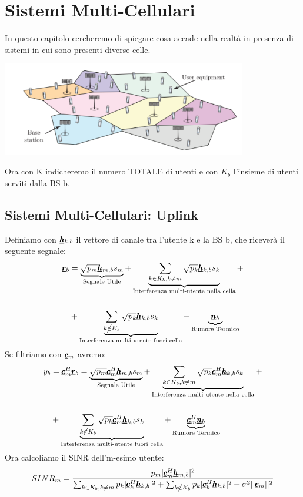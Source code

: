 \chapter{Sistemi Multi-Cellulari}
In questo capitolo cercheremo di spiegare cosa accade nella realtà in presenza di sistemi in cui sono presenti diverse celle.
\begin{center}
    \includegraphics[width=0.8\textwidth]{Images/Accass.png}
\end{center}
Ora con K indicheremo il numero TOTALE di utenti e con $K_b$ l'insieme di utenti serviti dalla BS b.
\section{Sistemi Multi-Cellulari: Uplink}
Definiamo con $\pmb{\underline{h}}_{k,b}$ il vettore di canale tra l'utente k e la BS b, che riceverà il seguente segnale:
\begin{equation*}
    \begin{aligned}
    \pmb{\underline{r}}_b &= \underbrace{\sqrt{p_m} \pmb{\underline{h}}_{m,b}s_m}_{\text{Segnale Utile}} + \underbrace{\sum_{k \in K_b, k \neq m} \sqrt{p_k} \pmb{\underline{h}}_{k,b}s_k}_{\text{Interferenza multi-utente nella cella}} +\\ \\
    &+ \underbrace{\sum_{k \cancel{\in} K_b} \sqrt{p_k} \pmb{\underline{h}}_{k,b}s_k}_{\text{Interferenza multi-utente fuori cella}} + \underbrace{\pmb{\underline{n}}_b}_{\text{Rumore Termico}}
     \end{aligned}
\end{equation*}
Se filtriamo con $\pmb{\underline{c}}_m$ avremo:
\begin{equation*}
\begin{aligned}
        y_b &= \pmb{\underline{c}}_m^H \pmb{\underline{r}}_b = \underbrace{\sqrt{p_m}\pmb{\underline{c}}_m^H \pmb{\underline{h}}_{m,b}s_m}_{\text{Segnale Utile}} + \underbrace{\sum_{k \in K_b, k \neq m} \sqrt{p_k}\pmb{\underline{c}}_m^H \pmb{\underline{h}}_{k,b}s_k}_{\text{Interferenza multi-utente nella cella}} +\\ \\
        &+ \underbrace{\sum_{k \cancel{\in} K_b} \sqrt{p_k}\pmb{\underline{c}}_m^H \pmb{\underline{h}}_{k,b}s_k}_{\text{Interferenza multi-utente fuori cella}} + \underbrace{\pmb{\underline{c}}_m^H\pmb{\underline{n}}_b}_{\text{Rumore Termico}}
\end{aligned}
\end{equation*}
Ora calcoliamo il SINR dell'm-esimo utente:
\begin{equation*}
    SINR_m = \frac{p_m |\pmb{\underline{c}}_m^H\pmb{\underline{h}}_{m,b}|^2}{\sum_{k \in K_b, k \neq m} p_k |\pmb{\underline{c}}_k^H\pmb{\underline{h}}_{k,b}|^2 + \sum_{k \cancel{\in} K_b}  p_k |\pmb{\underline{c}}_k^H\pmb{\underline{h}}_{k,b}|^2 + \sigma^2 ||\pmb{\underline{c}}_m||^2} 
\end{equation*}


